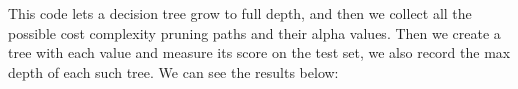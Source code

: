 \documentclass[
  letterpaper,
  DIV=11,
  numbers=noendperiod]{scrartcl}
\begin{document}
This code lets a decision tree grow to full depth, and then we collect
all the possible cost complexity pruning paths and their alpha values.
Then we create a tree with each value and measure its score on the test
set, we also record the max depth of each such tree. We can see the
results below:

\begin{figure}

\begin{minipage}[t]{0.50\linewidth}

{\centering 


}

\end{minipage}%
%
\begin{minipage}[t]{0.50\linewidth}

{\centering 

}
\end{minipage}
\end{figure}
\end{document}
